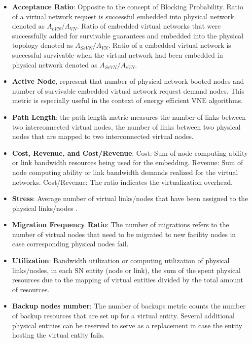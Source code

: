 \begin{itemize}
  \item \textbf{Acceptance Ratio}: Opposite to the concept of Blocking Probability. Ratio of a virtual network request is successful embedded into physical network denoted as $A_{eVN}/A_{VN}$. Ratio of embedded virtual networks that were successfully added for survivable guarantees and embedded into the physical topology denoted as $A_{SeVN}/A_{VN}$. Ratio of a embedded virtual network is successful survivable when the virtual network had been embedded in physical network denoted as $A_{SeVN}/A_{eVN}$.
  \item \textbf{Active Node}, represent that number of physical network booted nodes and number of survivable embedded virtual network request demand nodes. This metric is especially useful in the context of energy efficient VNE algorithms.
  \item \textbf{Path Length}: the path length metric measures the number of links between two interconnected virtual nodes, the number of links between two physical nodes that are mapped to two interconnected virtual nodes.

  \item \textbf{Cost, Revenue, and Cost/Revenue}: Cost: Sum of node computing ability or link bandwidth resources being used for the embedding. Revenue: Sum of node computing ability or link bandwidth demands realized for the virtual networks. Cost/Revenue: The ratio indicates the virtualization overhead.
  \item \textbf{Stress}: Average number of virtual links/nodes that have been assigned to the physical links/nodes .
 \item \textbf{Migration Frequency Ratio}: The number of migrations refers to the number of virtual nodes that need to be migrated to new facility nodes in case corresponding physical nodes fail.
 \item \textbf{Utilization}: Bandwidth utilization or computing utilization of physical links/nodes, in each SN entity (node or link), the sum of the spent physical resources due to the mapping of virtual entities divided by the total amount of resources.
 \item \textbf{Backup nodes number}: The number of backups metric counts the number of backup resources that are set up for a virtual entity. Several additional physical entities can be reserved to serve as a replacement in case the entity hosting the virtual entity fails.
\end{itemize}
